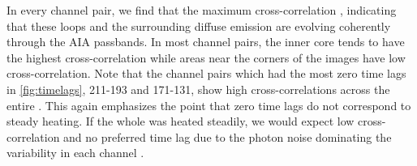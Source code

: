 In every channel pair, we find that the maximum cross-correlation , indicating that these loops and the surrounding diffuse emission are evolving coherently through the AIA passbands.
In most channel pairs, the inner core tends to have the highest cross-correlation while areas near the corners of the images have low cross-correlation.
Note that the channel pairs which had the most zero time lags in \autoref{fig:timelags}, 211-193 and 171-131, show high cross-correlations across the entire \AR{}.
This again emphasizes the point that zero time lags do not correspond to steady heating.
If the whole \AR{} was heated steadily, we would expect low cross-correlation and no preferred time lag due to the photon noise dominating the variability in each channel \citep{viall_signatures_2016}.
